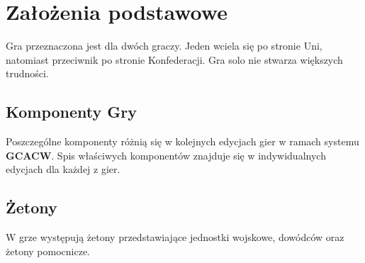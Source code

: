 \section{Założenia podstawowe}
Gra przeznaczona jest dla dwóch graczy. Jeden wciela się po stronie Uni, natomiast przeciwnik po stronie Konfederacji. Gra solo nie stwarza większych trudności.

\subsection{Komponenty Gry}
Poszczególne komponenty różnią się w kolejnych edycjach gier w ramach systemu \textbf{GCACW}. Spis właściwych komponentów znajduje się w indywidualnych edycjach dla każdej z gier.

\subsection{Żetony}
W grze występują żetony przedstawiające jednostki wojskowe, dowódców oraz żetony pomocnicze.
